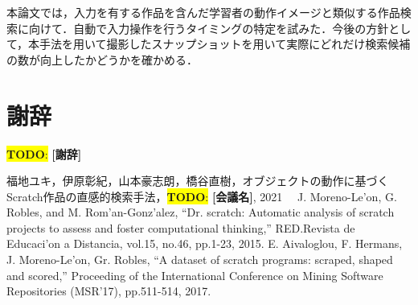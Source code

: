 \documentclass[uplatex,dvipdfmx,a4paper,twocolumn,base=11pt,jbase=11pt,ja=standard]{bxjsarticle}  %
\newcommand{\todo}[1]{\colorbox{yellow}{{\bf TODO}:}{\color{red} {\textbf{[#1]}}}}
\begin{document}


本論文では，入力を有する作品を含んだ学習者の動作イメージと類似する作品検索に向けて．自動で入力操作を行うタイミングの特定を試みた．今後の方針として，本手法を用いて撮影したスナップショットを用いて実際にどれだけ検索候補の数が向上したかどうかを確かめる．











\section*{謝辞}

\todo{謝辞}

\begin{thebibliography}{1}
   福地ユキ，伊原彰紀，山本豪志朗，橋谷直樹，オブジェクトの動作に基づくScratch作品の直感的検索手法，\todo{会議名}, 2021
  　J. Moreno-Le'on, G. Robles, and M. Rom'an-Gonz'alez, ``Dr. scratch: Automatic analysis of scratch projects to assess and foster computational thinking,'' RED.Revista de Educaci'on a Distancia, vol.15, no.46, pp.1-23, 2015.
   E. Aivaloglou, F. Hermans, J. Moreno-Le'on, Gr. Robles, ``A dataset of scratch programs: scraped, shaped and scored,'' Proceeding of the International Conference on Mining Software Repositories (MSR'17), pp.511-514, 2017. 

\end{thebibliography}





%
\end{document}
